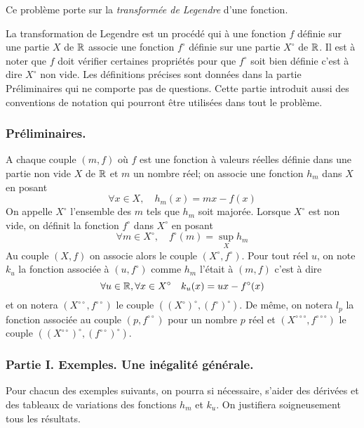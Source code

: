 
Ce problème porte sur la \emph{transformée de Legendre} d'une fonction.

La transformation de Legendre est un procédé qui à une fonction $f$ définie sur une partie $X$ de $\mathbb{R}$ associe une fonction $f^{\circ}$ définie sur une partie $X^{\circ}$ de $\mathbb{R}$.
Il est à noter que $f$ doit vérifier certaines propriétés pour que $f^{\circ}$ soit bien définie c'est à dire $X^{\circ}$ non vide.\newline
Les définitions précises sont données dans la partie Préliminaires qui ne comporte pas de questions. Cette partie introduit aussi des conventions de notation qui pourront être utilisées dans tout le problème.

\subsubsection*{Préliminaires.}
A chaque couple $(m,f)$ o\`{u} $f$ est une fonction \`{a} valeurs
r\'{e}elles d\'{e}finie dans une partie non vide $X$ de $\mathbb{R}$ et $m$
un nombre r\'{e}el; on associe une fonction $h_{m}$ dans $X$ en posant
\[
\forall x\in X,\mathbf{\quad }h_{m}(x)=mx-f(x)
\]
On appelle $X^{\circ }$ l'ensemble des $m$ tels que $h_{m}$ soit major\'{e}e.
Lorsque $X^{\circ }$ est non vide, on d\'{e}finit la fonction $f^{\circ }$
dans $X^{\circ }$ en posant
\[
\forall m\in X^{\circ },\quad f^{\circ }(m)=\sup_{X}h_{m}
\]
Au couple $(X,f)$ on associe alors le couple $(X^{\circ },f^{\circ })$. Pour
tout r\'{e}el $u$, on note $k_{u}$ la fonction associ\'{e}e \`{a} $%
(u,f^{\circ })$ comme $h_{m}$ l'\'{e}tait \`{a} $(m,f)$ c'est \`{a} dire
\[
\forall u\in \R ,\forall x\in X^{\circ }\mathbf{\quad }%
k_{u}(x)=ux-f^{\circ }(x)
\]
et on notera $(X^{\circ \circ },f^{\circ \circ })$ le couple $((X^{\circ
})^{\circ },(f^{\circ })^{\circ })$. De m\^{e}me, on notera $l_{p}$ la
fonction associ\'{e}e au couple $(p,f^{\circ \circ })$ pour un nombre $p$
r\'{e}el et $(X^{\circ \circ \circ },f^{\circ \circ \circ })$ le couple $%
((X^{\circ \circ })^{\circ },(f^{\circ \circ })^{\circ })$.

\subsubsection*{Partie I. Exemples. Une inégalité générale.}

Pour chacun des exemples suivants, on pourra si n\'{e}cessaire, s'aider des
d\'{e}riv\'{e}es et des tableaux de variations des fonctions $h_{m}$ et $k_{u} $. On justifiera soigneusement tous les r\'{e}sultats.

